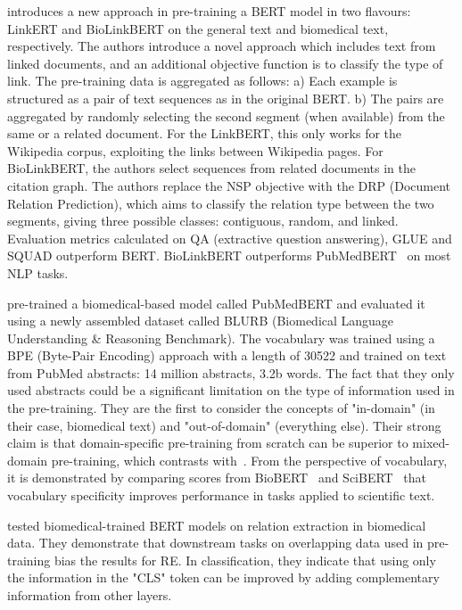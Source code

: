 \cite{yasunaga2020linkbert} introduces a new approach in pre-training a BERT model in two flavours: LinkERT and BioLinkBERT on the general text and biomedical text, respectively.
The authors introduce a novel approach which includes text from linked documents, and an additional objective function is to classify the type of link.
The pre-training data is aggregated as follows: a) Each example is structured as a pair of text sequences as in the original BERT. b) The pairs are aggregated by randomly selecting the second segment (when available) from the same or a related document. For the LinkBERT, this only works for the Wikipedia corpus, exploiting the links between Wikipedia pages. For BioLinkBERT, the authors select sequences from related documents in the citation graph. 
The authors replace the NSP objective with the DRP (Document Relation Prediction), which aims to classify the relation type between the two segments, giving three possible classes: contiguous, random, and linked.  
Evaluation metrics calculated on QA (extractive question answering), GLUE and SQUAD outperform BERT. BioLinkBERT outperforms PubMedBERT~\cite{gu2020pubmedbert} on most NLP tasks. 

\cite{gu2020pubmedbert} pre-trained a biomedical-based model called PubMedBERT and evaluated it using a newly assembled dataset called BLURB (Biomedical Language Understanding \& Reasoning Benchmark). 
The vocabulary was trained using a BPE (Byte-Pair Encoding) approach with a length of 30522 and trained on text from PubMed abstracts: 14 million abstracts, 3.2b words. 
The fact that they only used abstracts could be a significant limitation on the type of information used in the pre-training. 
They are the first to consider the concepts of "in-domain" (in their case, biomedical text) and "out-of-domain" (everything else). 
Their strong claim is that domain-specific pre-training from scratch can be superior to mixed-domain pre-training, which contrasts with~\cite{hong2022ScholarBERT}. 
From the perspective of vocabulary, it is demonstrated by comparing scores from BioBERT~\cite{lee2019biobert} and SciBERT~\cite{Beltagy2019SciBERT} that vocabulary specificity improves performance in tasks applied to scientific text. 

\cite{su2022investigation} tested biomedical-trained BERT models on relation extraction in biomedical data. They demonstrate that downstream tasks on overlapping data used in pre-training bias the results for RE. In classification, they indicate that using only the information in the "CLS" token can be improved by adding complementary information from other layers. 


